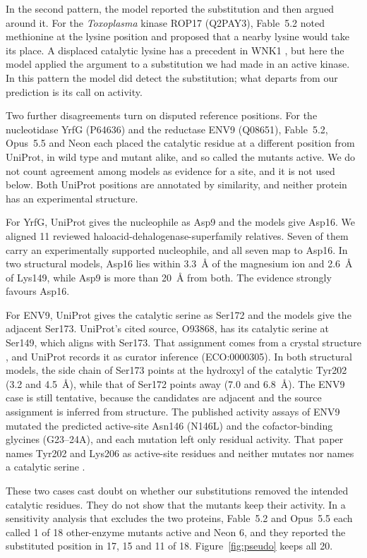 \documentclass[11pt]{article}
\begin{document}
In the second pattern, the model reported the substitution and then argued around it. For the
\textit{Toxoplasma} kinase ROP17 (Q2PAY3), Fable~5.2 noted methionine at the lysine position and proposed
that a nearby lysine would take its place. A displaced catalytic lysine has a precedent in WNK1
\citep{xu2000wnk1}, but here the model applied the argument to a substitution we had made in an active
kinase. In this pattern the model did detect the substitution; what departs from our prediction is its
call on activity.

Two further disagreements turn on disputed reference positions. For the nucleotidase YrfG (P64636)
and the reductase ENV9 (Q08651), Fable~5.2, Opus~5.5 and Neon each placed the catalytic residue at a
different position from UniProt, in wild type and mutant alike, and so called the mutants active. We do
not count agreement among models as evidence for a site, and it is not used below. Both UniProt
positions are annotated by similarity, and neither protein has an experimental structure.

For YrfG, UniProt gives the nucleophile as Asp9 and the models give Asp16. We aligned 11 reviewed haloacid-dehalogenase-superfamily relatives. Seven of them carry an
experimentally supported nucleophile, and all seven map to Asp16. In two structural models, Asp16 lies within 3.3~\AA{} of the magnesium ion and 2.6~\AA{} of
Lys149, while Asp9 is more than 20~\AA{} from both. The evidence strongly favours Asp16.

For ENV9, UniProt gives the catalytic serine as Ser172 and the models give the adjacent Ser173. UniProt's
cited source, O93868, has its catalytic serine at Ser149, which aligns with Ser173. That assignment comes
from a crystal structure \citep{horer2001mannitol}, and UniProt records it as curator inference
(ECO:0000305). In both structural models, the side chain of Ser173 points at the hydroxyl of the
catalytic Tyr202 (3.2 and 4.5~\AA), while that of Ser172 points away (7.0 and 6.8~\AA). The ENV9 case is
still tentative, because the candidates are adjacent and the source assignment is inferred from
structure. The published activity assays of ENV9 mutated the predicted active-site Asn146 (N146L) and the
cofactor-binding glycines (G23--24A), and each mutation left only residual activity. That paper names
Tyr202 and Lys206 as active-site residues and neither mutates nor names a catalytic serine
\citep{siddiqah2017env9}.

These two cases cast doubt on whether our substitutions removed the intended catalytic residues. They do
not show that the mutants keep their activity. In a sensitivity analysis that excludes the two proteins,
Fable~5.2 and Opus~5.5 each called 1 of 18 other-enzyme mutants active and Neon 6, and they reported the
substituted position in 17, 15 and 11 of 18. Figure~\ref{fig:pseudo} keeps all 20.
\end{document}
